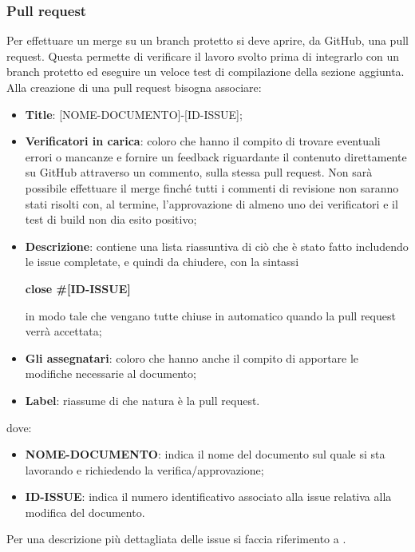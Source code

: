 \subsubsection{Pull request}\label{inf:pr}
Per effettuare un merge su un branch protetto si deve aprire, da GitHub, una
pull request. Questa permette di verificare il lavoro svolto prima di
integrarlo con un branch protetto ed eseguire un veloce test di compilazione
della sezione aggiunta. Alla creazione di una pull request bisogna associare:
\begin{itemize}
      \item \textbf{Title}: [NOME-DOCUMENTO]-[ID-ISSUE];
      \item \textbf{Verificatori in carica}: coloro che hanno il compito di trovare eventuali errori o mancanze e fornire un feedback
            riguardante il contenuto direttamente su GitHub attraverso un commento, sulla stessa pull request.
            Non sarà possibile effettuare il merge finché tutti i commenti di revisione non saranno stati risolti
            con, al termine, l'approvazione di almeno uno dei verificatori e il test di build non dia esito positivo;
      \item \textbf{Descrizione}: contiene una lista riassuntiva di ciò che è stato fatto includendo le issue completate, e quindi da chiudere,
            con la sintassi
            \begin{center}
                  \textbf{close \#[ID-ISSUE]}
            \end{center}
            in modo tale che vengano tutte chiuse in automatico quando la pull request verrà accettata;
      \item \textbf{Gli assegnatari}: coloro che hanno anche il compito di apportare le modifiche necessarie al documento;
      \item \textbf{Label}: riassume di che natura è la pull request.
\end{itemize}
dove:

\begin{itemize}
      \item \textbf{NOME-DOCUMENTO}: indica il nome del documento sul quale si sta lavorando e richiedendo la verifica/approvazione;
      \item \textbf{ID-ISSUE}: indica il numero identificativo associato alla issue relativa alla modifica del documento.
\end{itemize}

Per una descrizione più dettagliata delle issue si faccia riferimento a
.

